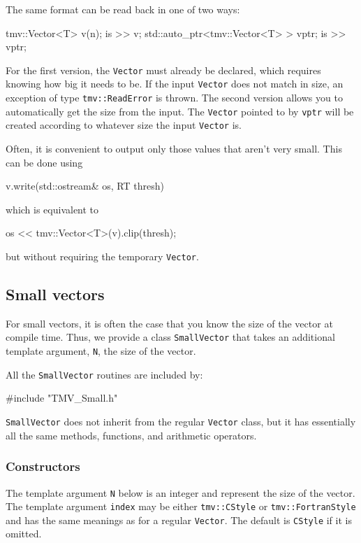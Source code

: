 \documentclass[twoside,letterpaper,11pt]{article}
\renewcommand{\tt}[1]{{\lstinline {#1}}}
\begin{document}
The same format can be read back in one of two ways:
\begin{tmvcode}
tmv::Vector<T> v(n);
is >> v;
std::auto_ptr<tmv::Vector<T> > vptr;
is >> vptr;
\end{tmvcode}
For the first version, the \tt{Vector} must already be declared, which 
requires knowing how big it needs to be.  If the input \tt{Vector} does not
match in size, an exception of type \tt{tmv::ReadError} is thrown.
The second version allows you to automatically get the size from the input.  
The \tt{Vector} pointed to by \tt{vptr}
will be created according to whatever size the input \tt{Vector} is.

Often, it is convenient to output only those values that aren't very small. 
This can be done using
\begin{tmvcode}
v.write(std::ostream& os, RT thresh)
\end{tmvcode}
which is equivalent to
\begin{tmvcode}
os << tmv::Vector<T>(v).clip(thresh);
\end{tmvcode}
but without requiring the temporary \tt{Vector}.

\subsection{Small vectors}
\label{SmallVector}

For small vectors, it is often the case that you know the size of the vector
at compile time.  Thus, we provide a class \tt{SmallVector} that takes an
additional template argument, \tt{N}, the size of the vector.

All the \tt{SmallVector} routines are included by:
\begin{tmvcode}
#include "TMV_Small.h"
\end{tmvcode}
\tt{SmallVector} does not inherit from the regular \tt{Vector} class, but it has 
essentially all the same methods, functions, and arithmetic operators. 

\subsubsection{Constructors}
\label{SmallVector_Constructors}

The template argument \tt{N} below is an integer and
represent the size of the vector.
The template argument 
 \tt{index} may be either \tt{tmv::CStyle} or
\tt{tmv::FortranStyle} and has the same meanings as 
for a regular \tt{Vector}. The default is \tt{CStyle} if it is omitted.
\end{document}
